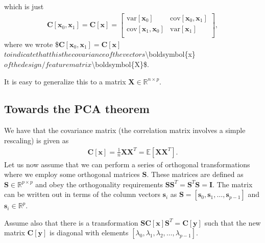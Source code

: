 \documentclass[letterpaper,10pt,english]{sphinxmanual}
\begin{document}
which is just
\begin{equation*}
\begin{split}
\boldsymbol{C}[\boldsymbol{x}_0,\boldsymbol{x}_1] = \boldsymbol{C}[\boldsymbol{x}]=\begin{bmatrix} \mathrm{var}[\boldsymbol{x}_0] & \mathrm{cov}[\boldsymbol{x}_0,\boldsymbol{x}_1] \\
                              \mathrm{cov}[\boldsymbol{x}_1,\boldsymbol{x}_0] & \mathrm{var}[\boldsymbol{x}_1] \\
             \end{bmatrix},
\end{split}
\end{equation*}
where we wrote \$\(\boldsymbol{C}[\boldsymbol{x}_0,\boldsymbol{x}_1] = \boldsymbol{C}[\boldsymbol{x}]\)\( to indicate that this the covariance of the vectors \)\textbackslash{}boldsymbol\{x\}\( of the design/feature matrix \)\textbackslash{}boldsymbol\{X\}\$.

It is easy to generalize this to a matrix \(\boldsymbol{X}\in {\mathbb{R}}^{n\times p}\).


\subsection{Towards the PCA theorem}
\label{\detokenize{chapter8:towards-the-pca-theorem}}
We have that the covariance matrix (the correlation matrix involves a simple rescaling) is given as
\begin{equation*}
\begin{split}
\boldsymbol{C}[\boldsymbol{x}] = \frac{1}{n}\boldsymbol{X}\boldsymbol{X}^T= \mathbb{E}[\boldsymbol{X}\boldsymbol{X}^T].
\end{split}
\end{equation*}
Let us now assume that we can perform a series of orthogonal transformations where we employ some orthogonal matrices \(\boldsymbol{S}\).
These matrices are defined as \(\boldsymbol{S}\in {\mathbb{R}}^{p\times p}\) and obey the orthogonality requirements \(\boldsymbol{S}\boldsymbol{S}^T=\boldsymbol{S}^T\boldsymbol{S}=\boldsymbol{I}\). The matrix can be written out in terms of the column vectors \(\boldsymbol{s}_i\) as \(\boldsymbol{S}=[\boldsymbol{s}_0,\boldsymbol{s}_1,\dots,\boldsymbol{s}_{p-1}]\) and \(\boldsymbol{s}_i \in {\mathbb{R}}^{p}\).

Assume also that there is a transformation \(\boldsymbol{S}\boldsymbol{C}[\boldsymbol{x}]\boldsymbol{S}^T=\boldsymbol{C}[\boldsymbol{y}]\) such that the new matrix \(\boldsymbol{C}[\boldsymbol{y}]\) is diagonal with elements \([\lambda_0,\lambda_1,\lambda_2,\dots,\lambda_{p-1}]\).
\end{document}
